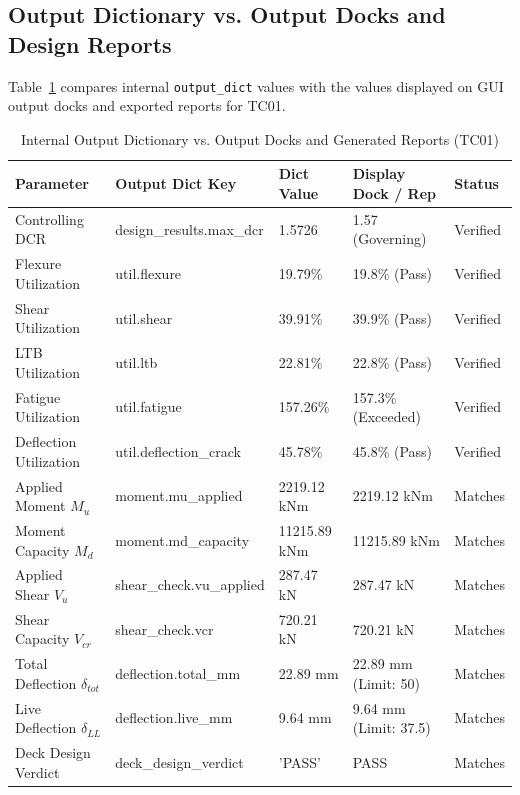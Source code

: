 \documentclass[11pt,a4paper]{article}
\begin{document}
\subsection{Output Dictionary vs. Output Docks and Design Reports}
Table~\ref{tab:output_mapping} compares internal \texttt{output\_dict} values with the values displayed on GUI output docks and exported reports for TC01.

\begin{table}[H]
\centering
\scriptsize
\setlength{\tabcolsep}{4pt}
\renewcommand{\arraystretch}{1.15}
\caption{Internal Output Dictionary vs. Output Docks and Generated Reports (TC01)}
\label{tab:output_mapping}
\begin{tabularx}{\textwidth}{p{3.0cm} >{\raggedright\arraybackslash\ttfamily}p{4.8cm} p{2.2cm} p{3.2cm} X}
\toprule
\textbf{Parameter} & \rmfamily\textbf{Output Dict Key} & \textbf{Dict Value} & \textbf{Display Dock / Rep} & \textbf{Status} \\
\midrule
Controlling DCR & design\_results.max\_dcr & 1.5726 & 1.57 (Governing) & Verified \\
Flexure Utilization & util.flexure & 19.79\% & 19.8\% (Pass) & Verified \\
Shear Utilization & util.shear & 39.91\% & 39.9\% (Pass) & Verified \\
LTB Utilization & util.ltb & 22.81\% & 22.8\% (Pass) & Verified \\
Fatigue Utilization & util.fatigue & 157.26\% & 157.3\% (Exceeded) & Verified \\
Deflection Utilization & util.deflection\_crack & 45.78\% & 45.8\% (Pass) & Verified \\
Applied Moment $M_u$ & moment.mu\_applied & 2219.12 kNm & 2219.12 kNm & Matches \\
Moment Capacity $M_d$ & moment.md\_capacity & 11215.89 kNm & 11215.89 kNm & Matches \\
Applied Shear $V_u$ & shear\_check.vu\_applied & 287.47 kN & 287.47 kN & Matches \\
Shear Capacity $V_{cr}$ & shear\_check.vcr & 720.21 kN & 720.21 kN & Matches \\
Total Deflection $\delta_{tot}$ & deflection.total\_mm & 22.89 mm & 22.89 mm (Limit: 50) & Matches \\
Live Deflection $\delta_{LL}$ & deflection.live\_mm & 9.64 mm & 9.64 mm (Limit: 37.5) & Matches \\
Deck Design Verdict & deck\_design\_verdict & 'PASS' & PASS & Matches \\
\bottomrule
\end{tabularx}
\end{table}
\end{document}
